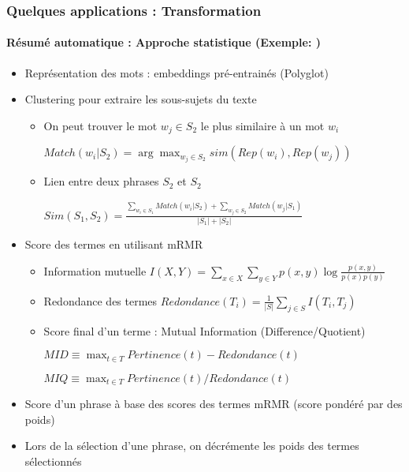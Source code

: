\documentclass[xcolor=table]{beamer}
\begin{document}
\begin{frame}
	\frametitle{Quelques applications : Transformation}
	\framesubtitle{Résumé automatique : Approche statistique (Exemple: \cite{15-oufaida-al})}
	\vspace{-6pt}
	\begin{itemize}
		\item Représentation des mots : embeddings pré-entrainés (Polyglot)
		\item Clustering pour extraire les sous-sujets du texte
		\begin{itemize}
			\item On peut trouver le mot $w_j \in S_2$ le plus similaire à un mot $w_i$
			
			$Match(w_i | S_2) = \arg\max_{w_j \in S_2} sim(Rep(w_i), Rep(w_j))$
			
			\item Lien entre deux phrases $S_2$ et $S_2$
			
			$Sim(S_1, S_2) = \frac{\sum_{w_i \in S_1} Match(w_i | S_2) + \sum_{w_j \in S_2} Match(w_j | S_1)}{|S_1| + |S_2|}$
		\end{itemize}
	
		\item Score des termes en utilisant mRMR
		\begin{itemize}
			\item Information mutuelle  
			$I(X, Y) = \sum\limits_{x \in X} \sum\limits_{y \in Y} p(x, y) \log \frac{p(x, y)}{p(x) p(y)}$
			\item Redondance des termes 
			$Redondance(T_i) = \frac{1}{|S|} \sum\limits_{j \in S} I(T_i, T_j)$
			
			\item Score final d'un terme : Mutual Information (Difference/Quotient)
			
			$MID \equiv \max_{t \in T} Pertinence(t) - Redondance(t)$

			$MIQ \equiv \max_{t \in T} Pertinence(t) / Redondance(t)$
		\end{itemize}
	
		\item Score d'un phrase à base des scores des termes mRMR (score pondéré par des poids)
	
		\item Lors de la sélection d'une phrase, on décrémente les poids des termes sélectionnés
	\end{itemize}
	
\end{frame}
\end{document}
